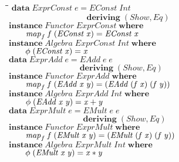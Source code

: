 \documentclass[11pt]{article}
\newlength{\lwidth}\setlength{\lwidth}{4.5cm}
\newlength{\cwidth}\setlength{\cwidth}{8mm} %
\newcommand{\Conid}[1]{\mathit{#1}}
\newcommand{\Varid}[1]{\mathit{#1}}
\begin{document}
\begin{tabbing}
\qquad\=\hspace{\lwidth}\=\hspace{\cwidth}\=\+\kill
${\mathbf{data}\;\Conid{ExprConst}\;\Varid{e}\mathrel{=}\Conid{EConst}\;\Conid{Int}}$\\
${\phantom{\mathbf{data}\;\Conid{ExprConst}\;\Varid{e}\mathrel{=}\mbox{}}\mathbf{deriving}\;(\Conid{Show},\Conid{Eq})}$\\
${}$\\
${\mathbf{instance}\;\Conid{Functor}\;\Conid{ExprConst}\;\mathbf{where}}$\\
${\hskip2.00em\relax\Varid{map}_{f}\;\Varid{f}\;(\Conid{EConst}\;\Varid{x})\mathrel{=}\Conid{EConst}\;\Varid{x}}$\\
${}$\\
${\mathbf{instance}\;\Conid{Algebra}\;\Conid{ExprConst}\;\Conid{Int}\;\mathbf{where}}$\\
${\hskip2.00em\relax\Varid{\phi}\;(\Conid{EConst}\;\Varid{x})\mathrel{=}\Varid{x}}$\\
${}$\\
${\mathbf{data}\;\Conid{ExprAdd}\;\Varid{e}\mathrel{=}\Conid{EAdd}\;\Varid{e}\;\Varid{e}}$\\
${\phantom{\mathbf{data}\;\Conid{ExprAdd}\;\Varid{e}\mathrel{=}\mbox{}}\mathbf{deriving}\;(\Conid{Show},\Conid{Eq})}$\\
${}$\\
${\mathbf{instance}\;\Conid{Functor}\;\Conid{ExprAdd}\;\mathbf{where}}$\\
${\hskip2.00em\relax\Varid{map}_{f}\;\Varid{f}\;(\Conid{EAdd}\;\Varid{x}\;\Varid{y})\mathrel{=}(\Conid{EAdd}\;(\Varid{f}\;\Varid{x})\;(\Varid{f}\;\Varid{y}))}$\\
${}$\\
${\mathbf{instance}\;\Conid{Algebra}\;\Conid{ExprAdd}\;\Conid{Int}\;\mathbf{where}}$\\
${\hskip2.00em\relax\Varid{\phi}\;(\Conid{EAdd}\;\Varid{x}\;\Varid{y})\mathrel{=}\Varid{x}\mathbin{+}\Varid{y}}$\\
${}$\\
${\mathbf{data}\;\Conid{ExprMult}\;\Varid{e}\mathrel{=}\Conid{EMult}\;\Varid{e}\;\Varid{e}}$\\
${\phantom{\mathbf{data}\;\Conid{ExprMult}\;\Varid{e}\mathrel{=}\mbox{}}\mathbf{deriving}\;(\Conid{Show},\Conid{Eq})}$\\
${}$\\
${\mathbf{instance}\;\Conid{Functor}\;\Conid{ExprMult}\;\mathbf{where}}$\\
${\hskip2.00em\relax\Varid{map}_{f}\;\Varid{f}\;(\Conid{EMult}\;\Varid{x}\;\Varid{y})\mathrel{=}(\Conid{EMult}\;(\Varid{f}\;\Varid{x})\;(\Varid{f}\;\Varid{y}))}$\\
${}$\\
${\mathbf{instance}\;\Conid{Algebra}\;\Conid{ExprMult}\;\Conid{Int}\;\mathbf{where}}$\\
${\hskip2.00em\relax\Varid{\phi}\;(\Conid{EMult}\;\Varid{x}\;\Varid{y})\mathrel{=}\Varid{x}\mathbin{*}\Varid{y}}$
\end{tabbing}
\end{document}
